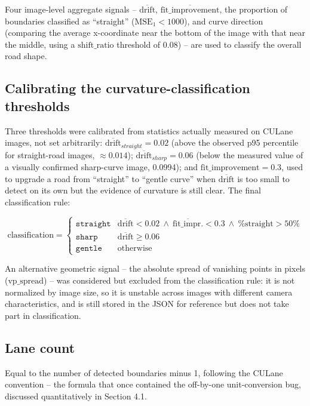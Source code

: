 \documentclass[12pt,a4paper]{report}
\begin{document}
Four image-level aggregate signals -- $\overline{\text{drift}}$, $\overline{\text{fit\_improvement}}$, the proportion of boundaries classified as ``straight'' ($\text{MSE}_1 < 1000$), and curve direction (comparing the average x-coordinate near the bottom of the image with that near the middle, using a $\text{shift\_ratio}$ threshold of $0.08$) -- are used to classify the overall road shape.

\subsection{Calibrating the curvature-classification thresholds}

Three thresholds were calibrated from statistics actually measured on CULane images, not set arbitrarily: $\overline{\text{drift}}_{straight}=0.02$ (above the observed p95 percentile for straight-road images, $\approx 0.014$); $\overline{\text{drift}}_{sharp}=0.06$ (below the measured value of a visually confirmed sharp-curve image, 0.0994); and $\text{fit\_improvement}=0.3$, used to upgrade a road from ``straight'' to ``gentle curve'' when $\overline{\text{drift}}$ is too small to detect on its own but the evidence of curvature is still clear. The final classification rule:

{\small
\[
\text{classification} =
\begin{cases}
\texttt{straight} & \overline{\text{drift}} < 0.02 \ \wedge\ \overline{\text{fit\_impr.}} < 0.3 \ \wedge\ \%\text{straight} > 50\% \\
\texttt{sharp}     & \overline{\text{drift}} \ge 0.06 \\
\texttt{gentle}    & \text{otherwise}
\end{cases}
\]
}

An alternative geometric signal -- the absolute spread of vanishing points in pixels ($\text{vp\_spread}$) -- was considered but excluded from the classification rule: it is not normalized by image size, so it is unstable across images with different camera characteristics, and is still stored in the JSON for reference but does not take part in classification.

\subsection{Lane count}

Equal to the number of detected boundaries minus 1, following the CULane convention -- the formula that once contained the off-by-one unit-conversion bug, discussed quantitatively in Section 4.1.
\end{document}
